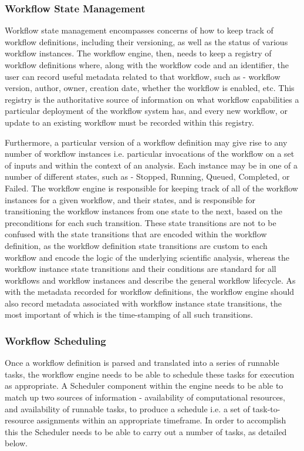\subsubsection{Workflow State Management}

Workflow state management encompasses concerns of how to keep track of workflow definitions, including their versioning, as well as the status of various workflow instances. The workflow engine, then, needs to keep a registry of workflow definitions where, along with the workflow code and an identifier, the user can record useful metadata related to that workflow, such as - workflow version, author, owner, creation date, whether the workflow is enabled, etc. This registry is the authoritative source of information on what workflow capabilities a particular deployment of the workflow system has, and every new workflow, or update to an existing workflow must be recorded within this registry.

Furthermore, a particular version of a workflow definition may give rise to any number of workflow instances i.e. particular invocations of the workflow on a set of inputs and within the context of an analysis. Each instance may be in one of a number of different states, such as - Stopped, Running, Queued, Completed, or Failed. The workflow engine is responsible for keeping track of all of the workflow instances for a given workflow, and their states, and is responsible for transitioning the workflow instances from one state to the next, based on the preconditions for each such transition. These state transitions are not to be confused with the state transitions that are encoded within the workflow definition, as the workflow definition state transitions are custom to each workflow and encode the logic of the underlying scientific analysis, whereas the workflow instance state transitions and their conditions are standard for all workflows and workflow instances and describe the general workflow lifecycle. As with the metadata  recorded for workflow definitions, the workflow engine should also record metadata associated with workflow instance state transitions, the most important of which is the time-stamping of all such transitions. 
   
\subsubsection {Workflow Scheduling}

Once a workflow definition is parsed and translated into a series of runnable tasks, the workflow engine needs to be able to schedule these tasks for execution as appropriate. A Scheduler component within the engine needs to be able to match up two sources of information - availability of computational resources, and availability of runnable tasks, to produce a schedule i.e. a set of task-to-resource assignments within an appropriate timeframe. In order to accomplish this the Scheduler needs to be able to carry out a number of tasks, as detailed below.

